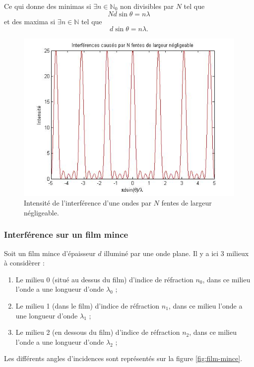 Ce qui donne des minimas si
$\exists n \in \mathbb{N}_0$ non divisibles par $N$ tel que
\[ N d \sin \theta = n \lambda \]
et des maxima si $\exists n \in \mathbb{N}$ tel que
\[ d \sin \theta = n \lambda. \]

\begin{figure}[ht]
	\centering
	\includegraphics[scale=0.5]{img/interference.jpg}
	\caption{Intensité de l'interférence d'une ondes par $N$ fentes de largeur négligeable.}
	\label{fig:interference}
\end{figure}

\subsubsection{Interférence sur un film mince}
Soit un film mince d'épaisseur $d$ illuminé par une onde
plane. Il y a ici 3 milieux à considèrer :

\begin{enumerate}
	\item Le milieu 0 (situé au dessus du film) d'indice
	de réfraction $n_0$, dans ce milieu l'onde a une longueur
	d'onde $\lambda_0$ ;
	\item Le milieu 1 (dans le film) d'indice de réfraction
	$n_1$, dans ce milieu l'onde a une longueur d'onde $\lambda_1$ ;
	\item Le milieu 2 (en dessous du film) d'indice de réfraction
	$n_2$, dans ce milieu l'onde a une longueur d'onde $\lambda_2$ ;
\end{enumerate}

Les différents angles d'incidences sont représentés sur la
figure \ref{fig:film-mince}.

